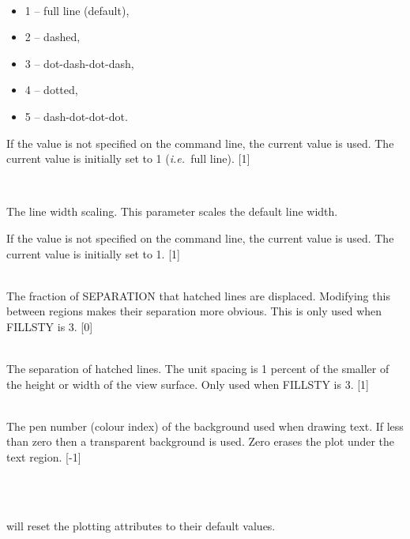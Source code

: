 \documentclass[twoside,11pt]{article}
\renewcommand{\_}{\texttt{\symbol{95}}}
\newcommand{\ie}{{\em i.e.\ }}
\newlength{\sstexampleslength}
\newcommand{\sstexamples}[1]{
   \item[Examples:] \mbox{} \\
   \vspace{-3.5ex}
   \begin{description}
      #1
   \end{description}
}
\newcommand{\sstsubsection}[1]{ \item[{#1}] \mbox{} \\}
\newcommand{\sstexamplesubsection}[2]{\sloppy
\item[\parbox{\sstexampleslength}{\ssttt #1}] \mbox{} \vspace{1.0ex}
\\ #2 }
\newcommand{\sstitemlist}[1]{
  \mbox{} \\
  \vspace{-3.5ex}
  \begin{itemize}
     #1
  \end{itemize}
}
\newcommand{\sstitem}{\item}
\newcommand{\sstexamples}[1]{
      \item[Examples:] \\
      \begin{description}
         #1
      \end{description}
      \\
   }
\newcommand{\sstsubsection}[1]{\item[{#1}]}
\newcommand{\sstexamplesubsection}[2]{\item[{\ssttt #1}] #2}
\newcommand{\sstitemlist}[1]{
      \begin{itemize}
         #1
      \end{itemize}
      \\
   }
\newcommand{\sstitem}{\item}
\begin{document}
{{{         \sstitemlist{

            \sstitem
               1 -- full line (default),

            \sstitem
               2 -- dashed,

            \sstitem
               3 -- dot-dash-dot-dash,

            \sstitem
               4 -- dotted,

            \sstitem
               5 -- dash-dot-dot-dot.

         }
         If the value is not specified on the command line, the current
         value is used. The current value is initially set to 1 
         (\ie full line).
         [1]
      }
      \sstsubsection{
         LINEWID = \_INTEGER (Read)
      }{
         The line width scaling. This parameter scales the default line
         width.

         If the value is not specified on the command line, the current
         value is used. The current value is initially set to 1.
         [1]
      }
      \sstsubsection{
         PHASE = \_REAL (Read)
      }{
         The fraction of SEPARATION that hatched lines are displaced.
         Modifying this between regions makes their separation more
         obvious. This is only used when FILLSTY is 3.
         [0]
      }
      \sstsubsection{
         SEPARATION = \_REAL (Read)
      }{
         The separation of hatched lines. The unit spacing is 1 percent
         of the smaller of the height or width of the view surface.
         Only used when FILLSTY is 3.
         [1]
      }
      \sstsubsection{
         TEXTBACK = \_INTEGER (Read)
      }{
         The pen number (colour index) of the background used when
         drawing text. If less than zero then a transparent
         background is used. Zero erases the plot under the text
         region.
         [-1]
      }
   }
   \sstexamples{
      \sstexamplesubsection{
         ICL$>$ CHANGE RESET
      }{
         will reset the plotting attributes to their default values.
      }
   }
}
\end{document}
